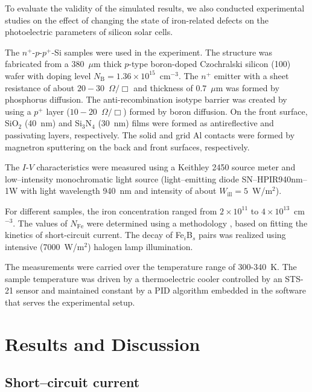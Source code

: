 \documentclass[a4paper,fleqn]{cas-sc}
\begin{document}
To evaluate the validity of the simulated results,
we also conducted experimental studies on the effect of changing the state of iron-related defects on the photoelectric parameters of silicon solar cells.

The $n^+$-$p$-$p^+$-Si samples were used in the experiment.
The structure was fabricated from a 380~$\mu$m thick $p$-type boron-doped
Czochralski silicon (100) wafer with doping level $N_\mathrm{B}=1.36\times10^{15}$~cm$^{-3}$.
The $n^+$ emitter with a sheet resistance of about $20-30$~$\Omega/\Box$
and  thickness of $0.7$~$\mu$m was formed by phosphorus diffusion.
The anti-recombination isotype barrier was created by using a $p^+$
layer ($10-20$~$\Omega/\Box$) formed by boron diffusion.
On the front surface, SiO$_2$ (40~nm) and Si$_3$N$_4$ (30~nm) films were formed as antireflective and passivating layers, respectively.
The solid and grid Al contacts were formed by magnetron sputtering on the back and front surfaces, respectively.

The $I$-$V$ characteristics were measured using a Keithley 2450 source meter and
low--intensity monochromatic light source (light--emitting diode SN--HPIR940nm--1W with light wavelength 940~nm and intensity of about  $W_\mathrm{ill} = 5$~W/m$^{2}$).

For different samples, the iron concentration ranged from $2\times10^{11}$ to $4\times10^{13}$~cm$^{-3}$.
The values of $N_\mathrm{Fe}$ were determined using a methodology \cite{Olikh2022:JMatSci,Olikh2021JAP}, based on fitting the kinetics of short-circuit current.
The decay of Fe$_i$B$_s$ pairs was realized using intensive (7000~W/$\mathrm{m}^{2}$) halogen lamp illumination.

The measurements were carried over the temperature range of 300-340~K.
The sample temperature was driven by a thermoelectric cooler controlled by an STS-21 sensor
and maintained constant by a PID algorithm embedded in the software that serves the experimental setup.


\section{Results and Discussion}%

\subsection{Short--circuit current}
\end{document}
